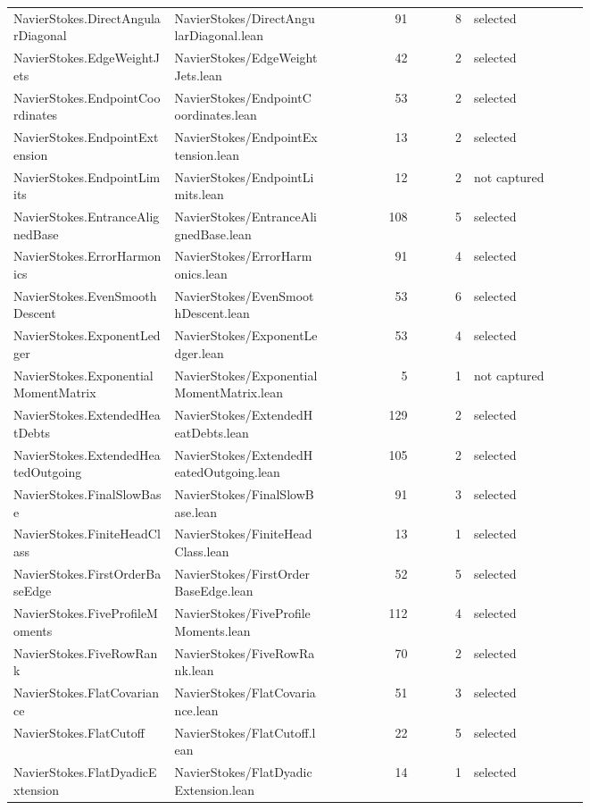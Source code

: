 \documentclass[10pt]{article}
\begin{document}
\begin{longtable}{p{0.28\linewidth}p{0.27\linewidth}r r p{0.20\linewidth}}
NavierStokes.DirectAngularDiagonal & NavierStokes/DirectAngularDiagonal.lean & 91 & 8 & selected\\
NavierStokes.EdgeWeightJets & NavierStokes/EdgeWeightJets.lean & 42 & 2 & selected\\
NavierStokes.EndpointCoordinates & NavierStokes/EndpointCoordinates.lean & 53 & 2 & selected\\
NavierStokes.EndpointExtension & NavierStokes/EndpointExtension.lean & 13 & 2 & selected\\
NavierStokes.EndpointLimits & NavierStokes/EndpointLimits.lean & 12 & 2 & not captured\\
NavierStokes.EntranceAlignedBase & NavierStokes/EntranceAlignedBase.lean & 108 & 5 & selected\\
NavierStokes.ErrorHarmonics & NavierStokes/ErrorHarmonics.lean & 91 & 4 & selected\\
NavierStokes.EvenSmoothDescent & NavierStokes/EvenSmoothDescent.lean & 53 & 6 & selected\\
NavierStokes.ExponentLedger & NavierStokes/ExponentLedger.lean & 53 & 4 & selected\\
NavierStokes.ExponentialMomentMatrix & NavierStokes/ExponentialMomentMatrix.lean & 5 & 1 & not captured\\
NavierStokes.ExtendedHeatDebts & NavierStokes/ExtendedHeatDebts.lean & 129 & 2 & selected\\
NavierStokes.ExtendedHeatedOutgoing & NavierStokes/ExtendedHeatedOutgoing.lean & 105 & 2 & selected\\
NavierStokes.FinalSlowBase & NavierStokes/FinalSlowBase.lean & 91 & 3 & selected\\
NavierStokes.FiniteHeadClass & NavierStokes/FiniteHeadClass.lean & 13 & 1 & selected\\
NavierStokes.FirstOrderBaseEdge & NavierStokes/FirstOrderBaseEdge.lean & 52 & 5 & selected\\
NavierStokes.FiveProfileMoments & NavierStokes/FiveProfileMoments.lean & 112 & 4 & selected\\
NavierStokes.FiveRowRank & NavierStokes/FiveRowRank.lean & 70 & 2 & selected\\
NavierStokes.FlatCovariance & NavierStokes/FlatCovariance.lean & 51 & 3 & selected\\
NavierStokes.FlatCutoff & NavierStokes/FlatCutoff.lean & 22 & 5 & selected\\
NavierStokes.FlatDyadicExtension & NavierStokes/FlatDyadicExtension.lean & 14 & 1 & selected\\

\end{longtable}
\end{document}
